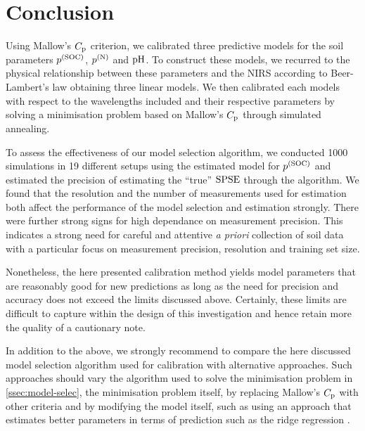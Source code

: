 \section{Conclusion}
\label{sec:conclusion}

	Using Mallow's $C_{\mathrm{p}}$ criterion, we calibrated three predictive models for the soil parameters $p^{(\mathrm{SOC})}$, $p^{(\mathrm{N})}$ and $\mathrm{pH}$.
	To construct these models, we recurred to the physical relationship between these parameters and the NIRS according to Beer-Lambert's law obtaining three linear models.
	We then calibrated each models with respect to the wavelengths included and their respective parameters by solving a minimisation problem based on Mallow's $C_{\mathrm{p}}$ through simulated annealing.
	
	To assess the effectiveness of our model selection algorithm, we conducted 1000 simulations in 19 different setups using the estimated model for $p^{(\mathrm{SOC})}$ and estimated the precision of estimating the \enquote{true} $\mathrm{SPSE}$ through the algorithm.
	We found that the resolution and the number of measurements used for estimation both affect the performance of the model selection and estimation strongly.
	There were further strong signs for high dependance on measurement precision.
	This indicates a strong need for careful and attentive \textsl{a priori} collection of soil data with a particular focus on measurement precision, resolution and training set size.
	
	Nonetheless, the here presented calibration method yields model parameters that are reasonably good for new predictions as long as the need for precision and accuracy does not exceed the limits discussed above.
	Certainly, these limits are difficult to capture within the design of this investigation and hence retain more the quality of a cautionary note.
	
	In addition to the above, we strongly recommend to compare the here discussed model selection algorithm used for calibration with alternative approaches.
	Such approaches should vary the algorithm used to solve the minimisation problem in \ref{ssec:model-selec}, the minimisation problem itself, by replacing Mallow's $C_{\mathrm{p}}$ with other criteria and by modifying the model itself, such as using an approach that estimates better parameters in terms of prediction such as the ridge regression \cite{schumacher:16b}.
	

